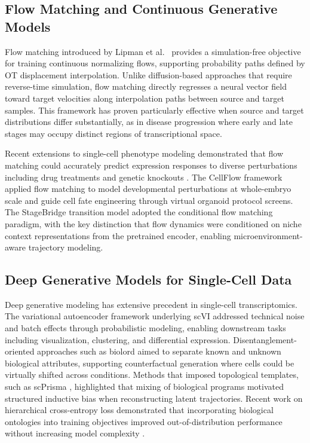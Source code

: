 \subsection{Flow Matching and Continuous Generative Models}

Flow matching introduced by Lipman et al.\ \cite{Lipman2022-ns} provides a simulation-free objective for training continuous normalizing flows, supporting probability paths defined by OT displacement interpolation. Unlike diffusion-based approaches that require reverse-time simulation, flow matching directly regresses a neural vector field toward target velocities along interpolation paths between source and target samples. This framework has proven particularly effective when source and target distributions differ substantially, as in disease progression where early and late stages may occupy distinct regions of transcriptional space.

Recent extensions to single-cell phenotype modeling demonstrated that flow matching could accurately predict expression responses to diverse perturbations including drug treatments and genetic knockouts \cite{Klein2025-sr}. The CellFlow framework applied flow matching to model developmental perturbations at whole-embryo scale and guide cell fate engineering through virtual organoid protocol screens. The StageBridge transition model adopted the conditional flow matching paradigm, with the key distinction that flow dynamics were conditioned on niche context representations from the pretrained encoder, enabling microenvironment-aware trajectory modeling.


\subsection{Deep Generative Models for Single-Cell Data}

Deep generative modeling has extensive precedent in single-cell transcriptomics. The variational autoencoder framework underlying scVI \cite{Lopez2018-ns} addressed technical noise and batch effects through probabilistic modeling, enabling downstream tasks including visualization, clustering, and differential expression. Disentanglement-oriented approaches such as biolord \cite{Piran2024-ca} aimed to separate known and unknown biological attributes, supporting counterfactual generation where cells could be virtually shifted across conditions. Methods that imposed topological templates, such as scPrisma \cite{Karin2023-sa}, highlighted that mixing of biological programs motivated structured inductive bias when reconstructing latent trajectories. Recent work on hierarchical cross-entropy loss demonstrated that incorporating biological ontologies into training objectives improved out-of-distribution performance without increasing model complexity \cite{Cultrera-di-Montesano2026-vq}.

